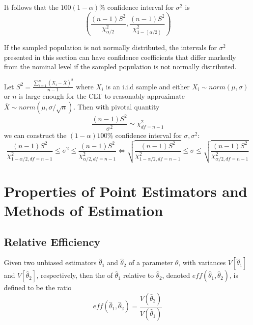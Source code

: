 \documentclass[12pt, a4paper, twoside, openright, titlepage]{book}
\begin{document}
\begin{prop}{}{}
    It follows that the $100(1-\alpha)\%$ confidence interval for $\sigma^2$ is \begin{equation*}
        \left(\frac{(n-1)S^2}{\chi^2_{\alpha/2}}, \frac{(n-1)S^2}{\chi^2_{1-(\alpha/2)}}\right)
    \end{equation*}
\end{prop}
If the sampled population is not normally distributed, the intervals for $\sigma^2$ presented in this section can have confidence coefficients that differ markedly from the nominal level if the sampled population is not normally distributed.


\begin{rmk}{}{}
    Let $S^2 = \frac{\sum_{i=1}^n(X_i-\overline{X})^2}{n-1}$ where $X_i$ is an i.i.d sample and either $X_i \sim norm(\mu,\sigma)$ or $n$ is large enough for the CLT to reasonably approximate $\overline{X} \sim norm(\mu, \sigma/\sqrt{n})$. Then with pivotal quantity \begin{equation*}
        \frac{(n-1)S^2}{\sigma^2} \sim \chi^2_{df = n-1}
    \end{equation*}
    we can construct the $(1-\alpha)100\%$ confidence interval for $\sigma,\sigma^2$: \begin{equation*}
        \frac{(n-1)S^2}{\chi^2_{1-\alpha/2,df = n-1}} \leq \sigma^2 \leq \frac{(n-1)S^2}{\chi^2_{\alpha/2,df = n-1}} \iff \sqrt{\frac{(n-1)S^2}{\chi^2_{1-\alpha/2,df = n-1}}} \leq \sigma \leq \sqrt{\frac{(n-1)S^2}{\chi^2_{\alpha/2,df = n-1}}}
    \end{equation*}
\end{rmk}




\chapter{Properties of Point Estimators and Methods of Estimation}

\section{\textsection Relative Efficiency}

\begin{defn}{}{}
    Given two unbiased estimators $\hat{\theta}_1$ and $\hat{\theta}_2$ of a parameter $\theta$, with variances $V[\hat{\theta}_1]$ and $V[\hat{\theta}_2]$, respectively, then the  of $\hat{\theta}_1$ relative to $\hat{\theta}_2$, denoted $eff(\hat{\theta}_1,\hat{\theta}_2)$, is defined to be the ratio \begin{equation*}
        eff(\hat{\theta}_1,\hat{\theta}_2) = \frac{V(\hat{\theta}_2)}{V(\hat{\theta}_1)}
    \end{equation*}
\end{defn}
\end{document}
